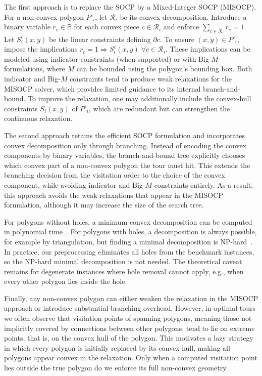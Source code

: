 \documentclass[11pt,a4paper]{article}
\theoremstyle{plain}
\begin{document}
The first approach is to replace the SOCP by a Mixed-Integer SOCP (MISOCP). For a non-convex polygon $P'_i$, let $\mathcal{R}_i$ be its convex decomposition. Introduce a binary variable $r_c \in \mathbb{B}$ for each convex piece $c \in \mathcal{R}_i$ and enforce $\sum_{c \in \mathcal{R}_i} r_c = 1$. Let $S_i^c(x,y)$ be the linear constraints defining $\partial c$. To ensure $(x,y) \in P'_i$, impose the implications $r_c = 1 \Rightarrow S_i^c(x,y) \; \forall c \in \mathcal{R}_i$. These implications can be modeled using indicator constraints (when supported) or with Big-$M$ formulations, where $M$ can be bounded using the polygon's bounding box. Both indicator and Big-$M$ constraints tend to produce weak relaxations for the MISOCP solver, which provides limited guidance to its internal branch-and-bound. To improve the relaxation, one may additionally include the convex-hull constraints $S_i(x,y)$ of $P'_i$, which are redundant but can strengthen the continuous relaxation.

The second approach retains the efficient SOCP formulation and incorporates convex decomposition only through branching. Instead of encoding the convex components by binary variables, the branch-and-bound tree explicitly chooses which convex part of a non-convex polygon the tour must hit. This extends the branching decision from the visitation order to the choice of the convex component, while avoiding indicator and Big-$M$ constraints entirely. As a result, this approach avoids the weak relaxations that appear in the MISOCP formulation, although it may increase the size of the search tree.

For polygons without holes, a minimum convex decomposition can be computed in polynomial time~\cite{ref30,ref10}. For polygons with holes, a decomposition is always possible, for example by triangulation, but finding a minimal decomposition is NP-hard~\cite{ref36}. In practice, our preprocessing eliminates all holes from the benchmark instances, so the NP-hard minimal decomposition is not needed. The theoretical caveat remains for degenerate instances where hole removal cannot apply, e.g., when every other polygon lies inside the hole.

Finally, any non-convex polygon can either weaken the relaxation in the MISOCP approach or introduce substantial branching overhead. However, in optimal tours we often observe that visitation points of spanning polygons, meaning those not implicitly covered by connections between other polygons, tend to lie on extreme points, that is, on the convex hull of the polygon. This motivates a lazy strategy in which every polygon is initially replaced by its convex hull, making all polygons appear convex in the relaxation. Only when a computed visitation point lies outside the true polygon do we enforce its full non-convex geometry.
\end{document}

